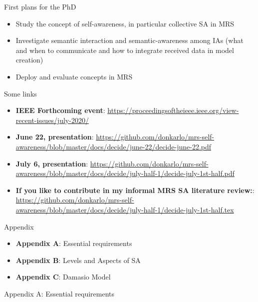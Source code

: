 \documentclass[unknownkeysallowed]{beamer}
\begin{document}
\begin{frame}{First plans for the PhD}         
	\begin{itemize}
		\item Study the concept of self-awareness, in particular collective SA in MRS
		\item Investigate semantic interaction and semantic-awareness among IAs (what and when to communicate and how to integrate received data in model creation)
		\item Deploy and evaluate concepts in MRS
	\end{itemize}
\end{frame}

\begin{frame}{Some links}
	\begin{itemize}
		\item \textbf{IEEE Forthcoming event}: \textcolor{blue}{\url{https://proceedingsoftheieee.ieee.org/view-recent-issues/july-2020/}}
		\item  \textbf{June 22, presentation}: \textcolor{blue}{\url{https://github.com/donkarlo/mrs-self-awareness/blob/master/docs/decide/june-22/decide-june-22.pdf}}
		\item  \textbf{July 6, presentation}: \textcolor{blue}{\url{https://github.com/donkarlo/mrs-self-awareness/blob/master/docs/decide/july-half-1/decide-july-1st-half.pdf}}
		\item  \textbf{If you like to contribute in my informal MRS SA literature review:}: \textcolor{blue}{\url{https://github.com/donkarlo/mrs-self-awareness/blob/master/docs/decide/july-half-1/decide-july-1st-half.tex}}
	\end{itemize}
\end{frame}

\begin{frame}{Appendix}
	\begin{itemize}
		\item \textbf{Appendix A}: Essential requirements
		\item \textbf{Appendix B}: Levels and Aspects of SA
		\item \textbf{Appendix C}: Damasio Model
	\end{itemize}
\end{frame}

\begin{frame}{Appendix A: Essential requirements}

\end{frame}
\end{document}
